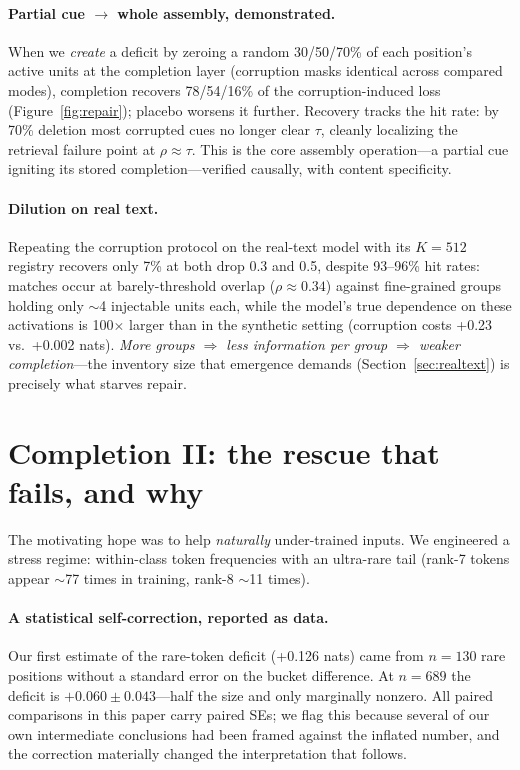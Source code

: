 \documentclass[11pt]{article}
\newcommand{\rrho}{\rho}
\begin{document}
\paragraph{Partial cue $\rightarrow$ whole assembly, demonstrated.} When we
\emph{create} a deficit by zeroing a random 30/50/70\% of each position's
active units at the completion layer (corruption masks identical across
compared modes), completion recovers 78/54/16\% of the corruption-induced loss
(Figure~\ref{fig:repair}); placebo worsens it further. Recovery tracks the hit
rate: by 70\% deletion most corrupted cues no longer clear $\tau$, cleanly
localizing the retrieval failure point at $\rrho \approx \tau$. This is the
core assembly operation---a partial cue igniting its stored
completion---verified causally, with content specificity.

\paragraph{Dilution on real text.} Repeating the corruption protocol on the
real-text model with its $K{=}512$ registry recovers only 7\% at both drop 0.3
and 0.5, despite 93--96\% hit rates: matches occur at barely-threshold overlap
($\rrho \approx 0.34$) against fine-grained groups holding only $\sim$4
injectable units each, while the model's true dependence on these activations
is 100$\times$ larger than in the synthetic setting (corruption costs +0.23
vs.\ +0.002 nats). \emph{More groups $\Rightarrow$ less information per group
$\Rightarrow$ weaker completion}---the inventory size that emergence demands
(Section~\ref{sec:realtext}) is precisely what starves repair.

\section{Completion II: the rescue that fails, and why}
\label{sec:rare}

The motivating hope was to help \emph{naturally} under-trained inputs. We
engineered a stress regime: within-class token frequencies with an ultra-rare
tail (rank-7 tokens appear $\sim$77 times in training, rank-8 $\sim$11
times).

\paragraph{A statistical self-correction, reported as data.} Our first
estimate of the rare-token deficit (+0.126 nats) came from $n{=}130$ rare
positions without a standard error on the bucket difference. At $n{=}689$ the
deficit is $+0.060 \pm 0.043$---half the size and only marginally nonzero.
All paired comparisons in this paper carry paired SEs; we flag this because
several of our own intermediate conclusions had been framed against the
inflated number, and the correction materially changed the interpretation
that follows.
\end{document}
